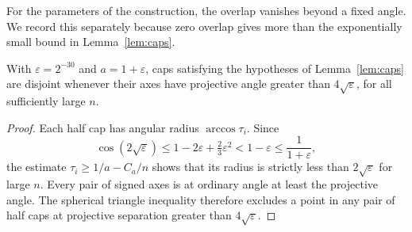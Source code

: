 For the parameters of the construction, the overlap vanishes beyond
a fixed angle. We record this separately because zero overlap gives
more than the exponentially small bound in Lemma~\ref{lem:caps}.

\begin{corollary}\label{cor:caps-disjoint}
With \(\varepsilon=2^{-30}\) and \(a=1+\varepsilon\), caps satisfying
the hypotheses of Lemma~\ref{lem:caps} are disjoint whenever their
axes have projective angle greater than \(4\sqrt\varepsilon\), for
all sufficiently large \(n\).
\end{corollary}

\begin{proof}
Each half cap has angular radius \(\arccos\tau_i\). Since
\[
 \cos(2\sqrt\varepsilon)
 \le1-2\varepsilon+\tfrac23\varepsilon^2
 <1-\varepsilon\le\frac1{1+\varepsilon},
\]
the estimate \(\tau_i\ge1/a-C_a/n\) shows that its radius is
strictly less than \(2\sqrt\varepsilon\) for large \(n\).
Every pair of signed axes is at ordinary angle at least the
projective angle. The spherical triangle inequality therefore
excludes a point in any pair of half caps at projective separation
greater than \(4\sqrt\varepsilon\).
\end{proof}
